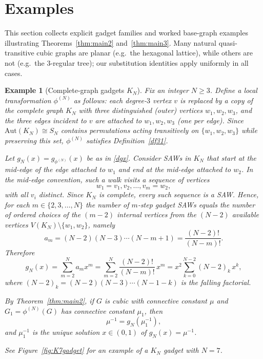 \documentclass[12pt]{amsart}
\theoremstyle{plain}
\newtheorem{example}[theorem]{Example}
\numberwithin{equation}{section}
\numberwithin{theorem}{section}
\numberwithin{figure}{section}
\begin{document}
\section{Examples}\label{sec:examples}

This section collects explicit gadget families and worked base-graph examples illustrating
Theorems~\ref{thm:main2} and~\ref{thm:main3}.  Many natural quasi-transitive cubic graphs
are planar (e.g.\ the hexagonal lattice), while others are not (e.g.\ the $3$-regular tree);
our substitution identities apply uniformly in all cases.

\begin{example}[Complete-graph gadgets $K_N$]\label{ex:KN}
Fix an integer $N\ge 3$. Define a local transformation $\phi^{(N)}$ as follows:
each degree-$3$ vertex $v$ is replaced by a copy of the complete graph $K_N$ with three
distinguished (outer) vertices $w_1,w_2,w_3$, and the three edges incident to $v$ are
attached to $w_1,w_2,w_3$ (one per edge).
Since $\mathrm{Aut}(K_N)\cong S_N$ contains permutations acting transitively on
$\{w_1,w_2,w_3\}$ while preserving this set, $\phi^{(N)}$ satisfies Definition~\ref{df31}.

Let $g_N(x)=g_{\phi^{(N)}}(x)$ be as in \eqref{dgx}.  Consider SAWs in $K_N$ that start at the
mid-edge of the edge attached to $w_1$ and end at the mid-edge attached to $w_2$.
In the mid-edge convention, such a walk visits a sequence of vertices
\[
w_1=v_1, v_2,\dots,v_m=w_2,
\]
with all $v_i$ distinct. Since $K_N$ is complete, every such sequence is a SAW. Hence, for
each $m\in\{2,3,\dots,N\}$ the number of $m$-step gadget SAWs equals the number of ordered
choices of the $(m-2)$ internal vertices from the $(N-2)$ available vertices
$V(K_N)\setminus\{w_1,w_2\}$, namely
\[
a_m = (N-2)(N-3)\cdots (N-m+1) = \frac{(N-2)!}{(N-m)!}.
\]
Therefore
\begin{equation}\label{eq:gN}
g_N(x)=\sum_{m=2}^{N} a_m x^m
=\sum_{m=2}^{N} \frac{(N-2)!}{(N-m)!}\,x^m
= x^2\sum_{k=0}^{N-2} (N-2)_k\, x^k,
\end{equation}
where $(N-2)_k=(N-2)(N-3)\cdots (N-1-k)$ is the falling factorial.

By Theorem~\ref{thm:main2}, if $G$ is cubic with connective constant $\mu$ and
$G_1=\phi^{(N)}(G)$ has connective constant $\mu_1$, then
\[
\mu^{-1}=g_N(\mu_1^{-1}),
\]
and $\mu_1^{-1}$ is the unique solution $x\in(0,1)$ of $g_N(x)=\mu^{-1}$.

See Figure~\ref{fig:K7gadget} for an example of a $K_N$ gadget with $N=7$.
\end{example}
\end{document}
